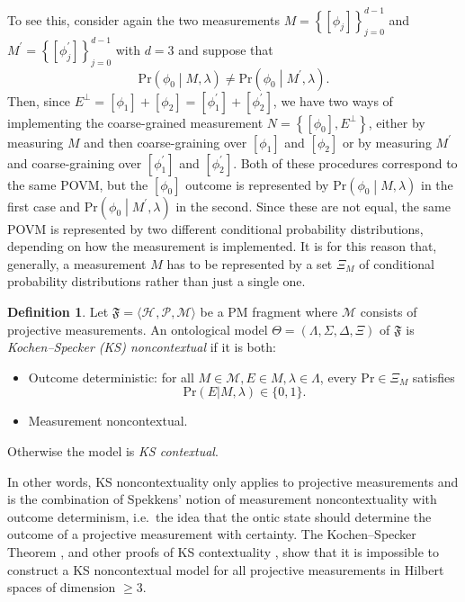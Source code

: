 \documentclass[DIV=calc,paper=a4,fontsize=11pt,twocolumn]{scrartcl} %
\theoremstyle{definition}
\newtheorem{definition}{Definition}[section]
\theoremstyle{plain}
\newcommand{\Proj}[1]{\ensuremath{\left [ #1 \right ]}}
\newcommand{\Hilb}[1][]{\ensuremath{\mathcal{H}_{#1}}}
\begin{document}
To see this, consider again the two measurements $M = \left \{
\Proj{\phi_j} \right\}_{j=0}^{d-1}$ and $M^{\prime} = \left \{
\Proj{\phi_j^{\prime}} \right \}_{j=0}^{d-1}$ with $d=3$ and suppose
that
\begin{equation}
\text{Pr} \left ( \phi_0 \middle | M,\lambda \right ) \neq
\text{Pr} \left ( \phi_0 \middle | M^{\prime},\lambda \right ).
\end{equation}
Then, since $E^{\perp} = \Proj{\phi_1} + \Proj{\phi_2} =
\Proj{\phi^{\prime}_1} + \Proj{\phi^{\prime}_2}$, we have two ways of
implementing the coarse-grained measurement $N = \left \{
\Proj{\phi_0}, E^{\perp} \right \}$, either by measuring $M$ and
then coarse-graining over $\Proj{\phi_1}$ and $\Proj{\phi_2}$ or by
measuring $M^{\prime}$ and coarse-graining over
$\Proj{\phi_1^{\prime}}$ and $\Proj{\phi_2^{\prime}}$.  Both of these
procedures correspond to the same POVM, but the $\Proj{\phi_0}$
outcome is represented by $\text{Pr} \left ( \phi_0 \middle |
M,\lambda \right )$ in the first case and $\text{Pr} \left ( \phi_0
\middle | M^{\prime},\lambda \right )$ in the second.  Since these
are not equal, the same POVM is represented by two different
conditional probability distributions, depending on how the
measurement is implemented.  It is for this reason that, generally, a
measurement $M$ has to be represented by a set $\Xi_M$ of conditional
probability distributions rather than just a single one.

\begin{definition}
Let $\mathfrak{F} = \langle \Hilb, \mathcal{P}, \mathcal{M} \rangle$
be a PM fragment where $\mathcal{M}$ consists of projective
measurements.  An ontological model $\Theta = (\Lambda, \Sigma, \Delta,
\Xi)$ of $\mathfrak{F}$ is \emph{Kochen--Specker (KS) noncontextual}
if it is both:
\begin{itemize}
\item Outcome deterministic: for all $M \in \mathcal{M}, E \in M,
\lambda \in \Lambda$, every $\text{Pr} \in \Xi_M$ satisfies
\begin{equation}
\text{Pr}(E|M,\lambda) \in \{0,1\}.
\end{equation}
\item Measurement noncontextual.
\end{itemize}
Otherwise the model is \emph{KS contextual}.
\end{definition}

In other words, KS noncontextuality only applies to projective
measurements and is the combination of Spekkens' notion of measurement
noncontextuality with outcome determinism, i.e.\ the idea that the
ontic state should determine the outcome of a projective measurement
with certainty.  The Kochen--Specker Theorem \cite{Kochen1967}, and
other proofs of KS contextuality \cite{Mermin1990, Peres1991,
Clifton1993, Cabello1996, Klyachko2008, Cabello2010, Liang2011,
Cabello2014}, show that it is impossible to construct a KS
noncontextual model for all projective measurements in Hilbert spaces
of dimension $\geq 3$.
\end{document}
